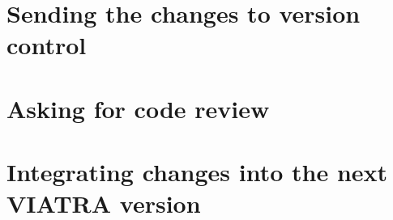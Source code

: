 \documentclass[11pt,a4paper,oneside]{report}
\begin{document}
\section{Sending the changes to version control}
\section{Asking for code review}
\section{Integrating changes into the next VIATRA version}



\nocite{*} %


\label{page:last}
\end{document}
